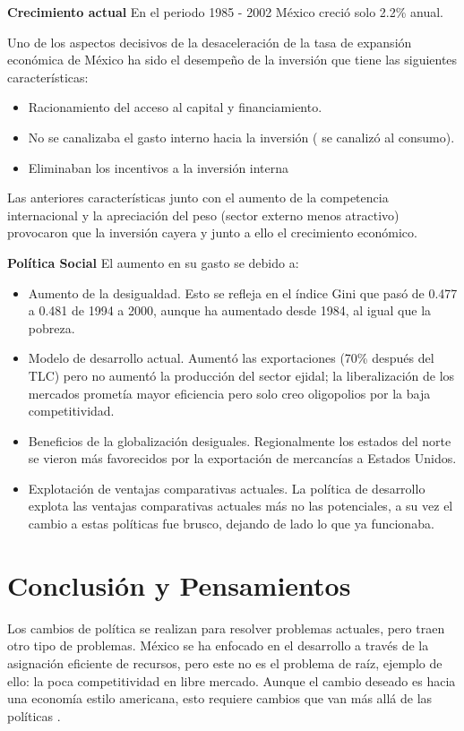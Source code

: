 \textbf{Crecimiento actual}
En el periodo 1985 - 2002 México creció solo 2.2\% anual.

Uno de los aspectos decisivos de la desaceleración de la tasa de expansión económica de México ha sido el desempeño de la inversión que tiene las siguientes características:
\begin{itemize}
    \item Racionamiento del acceso al capital y financiamiento.
    \item No se canalizaba el gasto interno hacia la inversión ( se canalizó al consumo).
    \item Eliminaban los incentivos a la inversión interna
\end{itemize}
Las anteriores características junto con el aumento de la competencia internacional y la apreciación del peso (sector externo menos atractivo) provocaron que la inversión cayera y junto a ello el crecimiento económico.


\textbf{Política Social} El aumento en  su gasto se debido a:
\begin{itemize}
    \item Aumento de la desigualdad. Esto se refleja en el índice Gini que pasó de 0.477 a 0.481 de 1994 a 2000, aunque ha aumentado desde 1984, al igual que la pobreza.
    \item Modelo de desarrollo actual. Aumentó las exportaciones (70\% después del TLC) pero no aumentó la producción del sector ejidal; la liberalización de los mercados prometía mayor eficiencia pero solo creo oligopolios por la baja competitividad.
    \item Beneficios de la globalización desiguales. Regionalmente los estados del norte se vieron más favorecidos por la exportación de mercancías a Estados Unidos.
    \item Explotación de ventajas comparativas actuales. La política de desarrollo explota las ventajas comparativas actuales más no las potenciales, a su vez el cambio a estas políticas fue brusco, dejando de lado lo que ya funcionaba.
\end{itemize}

\section{Conclusión y Pensamientos}
Los cambios de política se realizan para resolver problemas actuales, pero traen otro tipo de problemas. México se ha enfocado en el desarrollo a través de la asignación eficiente de recursos, pero este no es el problema de raíz, ejemplo de ello: la poca competitividad en libre mercado. Aunque el cambio deseado es hacia una economía estilo americana, esto requiere cambios que van más allá de las políticas \cite{ReformasHistoria}.
